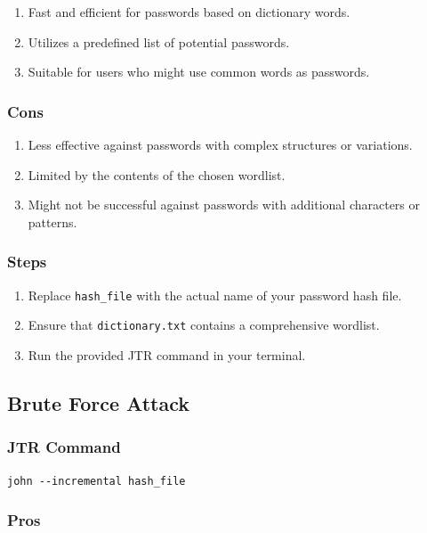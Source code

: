\documentclass[11pt]{article}
\begin{document}
\begin{enumerate}
    \item Fast and efficient for passwords based on dictionary words.
    \item Utilizes a predefined list of potential passwords.
    \item Suitable for users who might use common words as passwords.
\end{enumerate}

\subsubsection{Cons}

\begin{enumerate}
    \item Less effective against passwords with complex structures or variations.
    \item Limited by the contents of the chosen wordlist.
    \item Might not be successful against passwords with additional characters or patterns.
\end{enumerate}

\subsubsection{Steps}

\begin{enumerate}
    \item Replace \texttt{hash\_file} with the actual name of your password hash file.
    \item Ensure that \texttt{dictionary.txt} contains a comprehensive wordlist.
    \item Run the provided JTR command in your terminal.
\end{enumerate}


\subsection{Brute Force Attack}

\subsubsection{JTR Command}

\begin{verbatim}
john --incremental hash_file
\end{verbatim}

\subsubsection{Pros}
\end{document}
